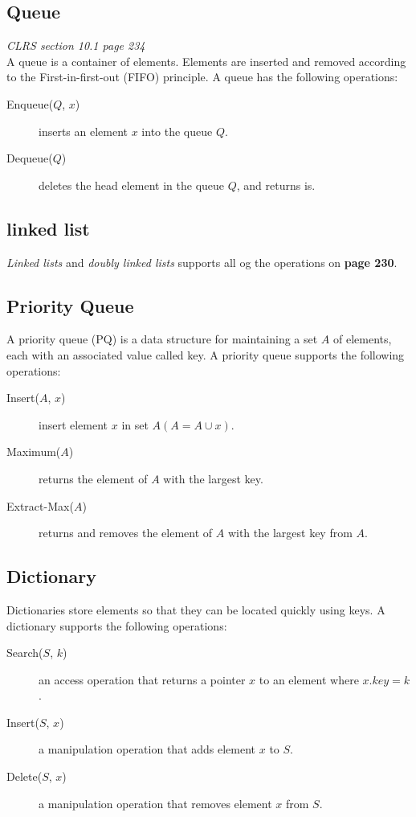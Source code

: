 \subsection{Queue}
\textit{CLRS section 10.1 page 234}\\
A queue is a container of elements. Elements are inserted and removed according to the First-in-first-out (FIFO) principle.
A queue has the following operations:
\begin{description}
	\item[Enqueue($ Q $, $ x $)] inserts an element $ x $ into the queue $ Q $.
	\item[Dequeue($ Q $)] deletes the head element in the queue $ Q $, and returns is. 
\end{description}

\subsection{linked list}
\textit{Linked lists} and \textit{doubly linked lists} supports all og the operations on \textbf{page 230}.

\subsection{Priority Queue}
A priority queue (PQ) is a data structure for maintaining a set $ A $ of elements, each with an associated value called key.
A priority queue supports the following operations:
\begin{description}
	\item[Insert($ A $, $ x $)]  insert element $ x $ in set $ A (A=A\cup{x}) $.
	\item[Maximum($ A $)] returns the element of $ A $ with the largest key.
	\item[Extract-Max($ A $)] returns and removes the element of $ A $ with the
	largest key from $ A $.
\end{description}

\subsection{Dictionary}
Dictionaries store elements so that they can be located quickly using keys.
A dictionary supports the following operations:
\begin{description}
	\item[Search($ S $, $ k $)] an access operation that returns a pointer $ x $ to an element where $ x.key = k $.
	\item[Insert($ S $, $ x $)] a manipulation operation that adds element $ x $ to $ S $.
	\item[Delete($ S $, $ x $)] a manipulation operation that removes element $ x $ from $ S $.
\end{description}